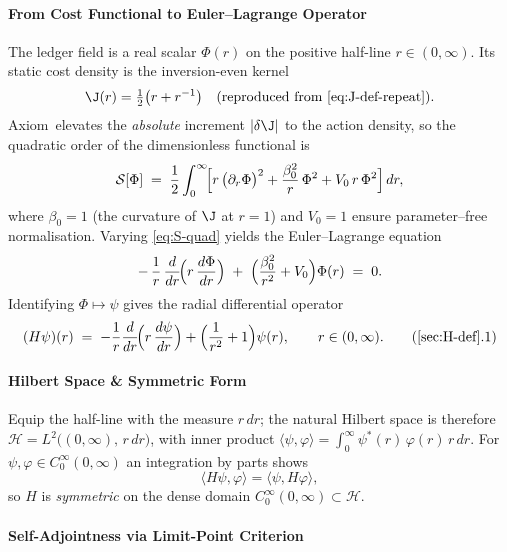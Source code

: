 \documentclass[11pt,oneside]{book}
\begin{document}
{\paragraph{From Cost Functional to Euler–Lagrange Operator}

The ledger field is a real scalar
\(
   \Phi(r)
\)
on the positive half-line
\(r\in(0,\infty)\).
Its static cost density is the inversion-even kernel
\[
   \J(r)=\tfrac12\bigl(r+r^{-1}\bigr)
   \quad\text{(reproduced from \eqref{eq:J-def-repeat})}.
\]
Axiom\, elevates the \emph{absolute} increment
\(
   |\delta\J|
\)
to the action density, so the quadratic order of the
dimensionless functional is
\[
   \mathcal{S}[\Phi]
   \;=\;
   \frac12
   \int_{0}^{\infty}
   \!\Bigl[
      r\,\bigl(\partial_{r}\Phi\bigr)^{2}
      +
      \frac{\beta_{0}^{2}}{r}\,\Phi^{2}
      +
      V_{0}\,r\,\Phi^{2}
   \Bigr]\,dr,
   \label{eq:S-quad}
\]
where
\(
   \beta_{0}=1
\)
(the curvature of \(\J\) at \(r=1\))
and
\(V_{0}=1\)
ensure parameter–free normalisation.
Varying \eqref{eq:S-quad} yields the Euler–Lagrange
equation
\[
   -\,\frac{1}{r}\,
   \frac{d}{dr}\!\Bigl(r\,\frac{d\Phi}{dr}\Bigr)
   \;+\;
   \Bigl(
      \frac{\beta_{0}^{2}}{r^{2}} + V_{0}
   \Bigr)\Phi(r)
   \;=\;
   0.
\]
Identifying \(\Phi\mapsto\psi\) gives
the radial differential operator
\[
   (H\psi)(r)
   \;=\;
   -\frac{1}{r}\frac{d}{dr}\!
        \Bigl(r\,\frac{d\psi}{dr}\Bigr)
   +\Bigl(
        \frac{1}{r^{2}} + 1
     \Bigr)\psi(r),
   \qquad
   r\in(0,\infty).
   \tag{\ref*{sec:H-def}.1}\label{eq:H-diff}
\]

\paragraph{Hilbert Space \& Symmetric Form}

Equip the half-line with the measure
\(r\,dr\);
the natural Hilbert space is therefore
\(
   \mathcal{H}=L^{2}\bigl((0,\infty),\,r\,dr\bigr)
\),
with inner product
\(
   \langle \psi,\varphi\rangle
   = \int_{0}^{\infty}\!
     \psi^{*}(r)\,\varphi(r)\,r\,dr.
\)
For
\(
   \psi,\varphi\in C_{0}^{\infty}(0,\infty)
\)
an integration by parts shows
\[
   \langle H\psi,\varphi\rangle
   = \langle \psi, H\varphi\rangle,
\]
so \(H\) is \emph{symmetric} on the dense domain
\(C_{0}^{\infty}(0,\infty)\subset\mathcal{H}\).

\paragraph{Self-Adjointness via Limit-Point Criterion}

}
\end{document}
